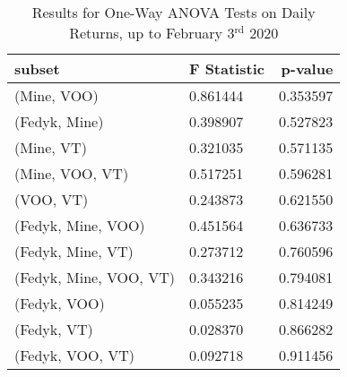 \begin{appendices}
\begin{table}[ht]
\centering
\caption{Results for One-Way ANOVA Tests on Daily Returns, up to February 3$^\text{rd}$ 2020}
    \begin{tabular}{l|ll}
    \toprule
        \textbf{subset}        & \multicolumn{1}{r}{\textbf{F Statistic}} & \multicolumn{1}{r}{\textbf{p-value}} \\ \midrule
        (Mine, VOO)                         & 0.861444                       & 0.353597                               \\
        (Fedyk, Mine)                       & 0.398907                       & 0.527823                               \\
        (Mine, VT)                          & 0.321035                       & 0.571135                               \\
        (Mine, VOO, VT)                     & 0.517251                       & 0.596281                               \\
        (VOO, VT)                           & 0.243873                       & 0.621550                               \\
        (Fedyk, Mine, VOO)                  & 0.451564                       & 0.636733                               \\
        (Fedyk, Mine, VT)                   & 0.273712                       & 0.760596                               \\
        (Fedyk, Mine, VOO, VT)              & 0.343216                       & 0.794081                               \\
        (Fedyk, VOO)                        & 0.055235                       & 0.814249                               \\
        (Fedyk, VT)                         & 0.028370                       & 0.866282                               \\
        (Fedyk, VOO, VT)                    & 0.092718                       & 0.911456                              
    \end{tabular}
\label{tab:anova_before}
\end{table}



\end{appendices}
